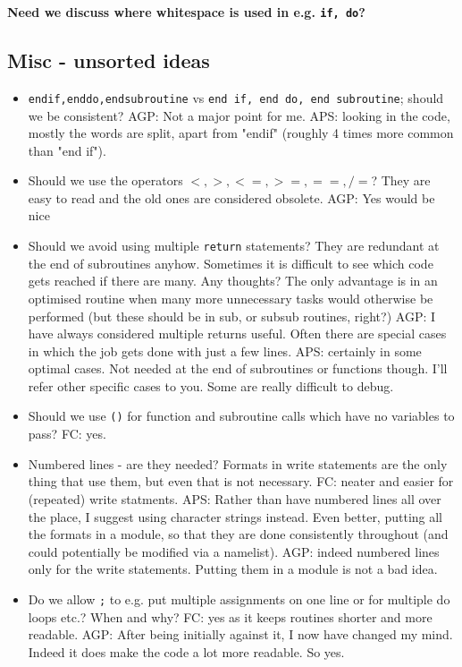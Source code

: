 \documentclass[12pt,twoside,notitlepage,a4paper]{article}
\newcommand{\code}[1]{\texttt{#1}}
\begin{document}
{\bf Need we discuss where whitespace is used in e.g. \code{if, do}?}

\subsection{Misc - unsorted ideas}

\begin{itemize}
\item \code{endif,enddo,endsubroutine} vs \code{end if, end do, end subroutine}; should we be consistent? 
AGP: Not a major point for me. APS: looking in the code, mostly the words are
split, apart from "endif" (roughly 4 times more common than "end if").
\item Should we use the operators $<, >, <=, >=, ==, /=$? They are easy to read and the
old ones are considered obsolete. AGP: Yes would be nice 
\item Should we avoid using multiple \code{return} statements? They are redundant at the end of subroutines
anyhow. Sometimes it is difficult to see which code gets reached if there are many. Any thoughts?
The only advantage is in an optimised routine when many more unnecessary tasks would otherwise be
performed (but these should be in sub, or subsub routines, right?) AGP: I have always considered multiple 
returns useful. Often there are special cases in which the job gets done with just a few lines. APS: certainly in
some optimal cases. Not needed at the end of subroutines or functions though. I'll refer other specific cases to you.
Some are really difficult to debug.
\item Should we use \code{()} for function and subroutine calls which have no variables to pass? FC: yes.
\item Numbered lines - are they needed? Formats in write statements are the only thing that use them, but
even that is not necessary. FC: neater and easier for (repeated) write statments. APS: Rather than have
numbered lines all over the place, I suggest using character strings instead. Even better, putting
all the formats in a module, so that they are done consistently throughout (and could potentially be
modified via a namelist). AGP: indeed numbered lines only for the write statements. Putting them in 
a module is not a bad idea. 
\item Do we allow \code{;} to e.g. put multiple assignments on one line or for multiple do loops etc.?
When and why?  FC: yes as it keeps routines shorter and more readable. AGP: After being initially against
it, I now have changed my mind. Indeed it does make the code a lot more readable. So yes. 

\end{itemize}
\end{document}
